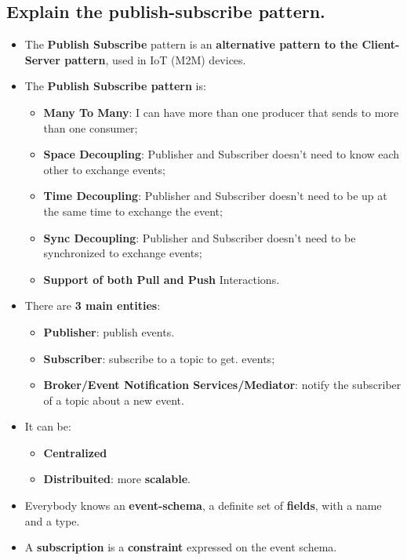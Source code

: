\documentclass[9pt, letterpaper]{article}
\begin{document}
\subsection{Explain the publish-subscribe pattern.}
\begin{itemize}
	\item The \textbf{Publish Subscribe} pattern is an \textbf{alternative pattern to the Client-Server pattern}, used in IoT (M2M) devices.
	\item The \textbf{Publish Subscribe pattern} is:
	      \begin{itemize}
		      \item \textbf{Many To Many}: I can have more than one producer that sends to more than one consumer;
		      \item \textbf{Space Decoupling}: Publisher and Subscriber doesn't need to know each other to exchange events;
		      \item \textbf{Time Decoupling}: Publisher and Subscriber doesn't need to be up at the same time to exchange the event;
		      \item \textbf{Sync Decoupling}: Publisher and Subscriber doesn't need to be synchronized to exchange events;
		      \item \textbf{Support of both Pull and Push} Interactions.
	      \end{itemize}
	\item There are \textbf{3 main entities}:
	      \begin{itemize}
		      \item \textbf{Publisher}: publish events.
		      \item \textbf{Subscriber}: subscribe to a topic to get. events;
		      \item \textbf{Broker/Event Notification Services/Mediator}: notify the subscriber of a topic about a new event.
	      \end{itemize}
	\item It can be:
	      \begin{itemize}
		      \item \textbf{Centralized}
		      \item \textbf{Distribuited}: more \textbf{scalable}.
	      \end{itemize}
	\item Everybody knows an \textbf{event-schema}, a definite set of \textbf{fields}, with a name and a type.
	\item A \textbf{subscription} is a \textbf{constraint} expressed on the event schema.

\end{itemize}
\end{document}
